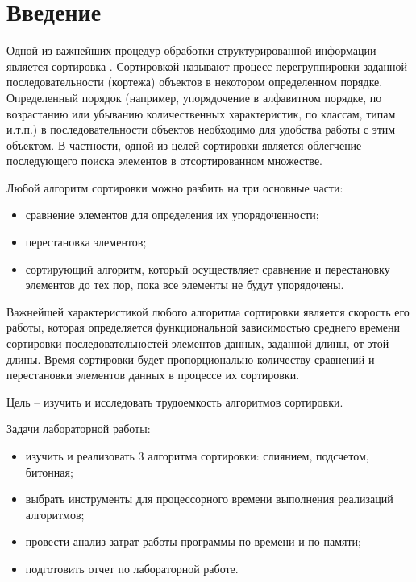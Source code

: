 \chapter*{Введение}

Одной из важнейших процедур обработки структурированной информации является сортировка \cite{Knut}. Сортировкой называют процесс перегруппировки заданной последовательности (кортежа) объектов в некотором определенном порядке. Определенный порядок (например, упорядочение в алфавитном порядке, по возрастанию или убыванию количественных характеристик, по классам, типам и.т.п.) в последовательности объектов необходимо для удобства работы с этим объектом. В частности, одной из целей сортировки является облегчение последующего поиска элементов в отсортированном множестве. 

Любой алгоритм сортировки можно разбить на три основные части:
\begin{itemize}
	\item сравнение элементов для определения их упорядоченности;
	\item перестановка элементов;
	\item сортирующий алгоритм, который осуществляет сравнение и перестановку элементов до тех пор, пока все элементы не будут упорядочены.
\end{itemize}

Важнейшей характеристикой любого алгоритма сортировки является скорость его работы, которая определяется функциональной зависимостью среднего времени сортировки последовательностей элементов данных, заданной длины, от этой длины. Время сортировки будет пропорционально количеству сравнений и перестановки элементов данных в процессе их сортировки.

Цель -- изучить и исследовать трудоемкость алгоритмов сортировки.

Задачи лабораторной работы:
\begin{itemize}
	\item изучить и реализовать 3 алгоритма сортировки: слиянием, подсчетом, битонная;
	\item выбрать инструменты для процессорного времени выполнения реализаций алгоритмов;
	\item провести анализ затрат работы программы по времени и по памяти;
	\item подготовить отчет по лабораторной работе.
\end{itemize}
